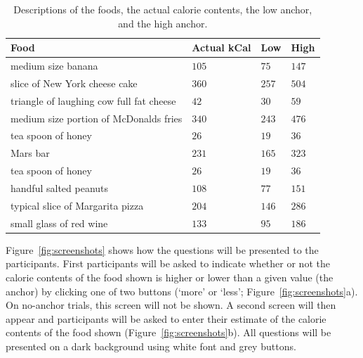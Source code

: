 \documentclass[a4paper,doc,natbib]{apa6}
\begin{document}
    \begin{table}[!h]
        \caption{Descriptions of the foods, the actual calorie contents, the low anchor, and the high anchor.}
        \label{tab:descriptions}
        \begin{tabular}{p{7cm}p{2cm}p{2cm}p{2cm}}
            \hline
            Food                                     & Actual kCal & Low   & High  \\
            \hline
            medium size banana                       & $105$       & $75$  & $147$ \\
            slice of New York cheese cake            & $360$       & $257$ & $504$ \\
            triangle of laughing cow full fat cheese & $42$        & $30$  & $59$  \\
            medium size portion of McDonalds fries   & $340$       & $243$ & $476$ \\
            tea spoon of honey                       & $26$        & $19$  & $36$  \\
            Mars bar                                 & $231$       & $165$ & $323$ \\
            tea spoon of honey                       & $26$        & $19$  & $36$  \\
            handful salted peanuts                   & $108$       & $77$  & $151$ \\
            typical slice of Margarita pizza         & $204$       & $146$ & $286$ \\
            small glass of red wine                  & $133$       & $95$  & $186$ \\
            \hline
        \end{tabular}
    \end{table}

    Figure~\ref{fig:screenshots} shows how the questions will be presented to the participants. First participants will be asked to indicate whether or not the calorie contents of the food shown is higher or lower than a given value (the anchor) by clicking one of two buttons (`more' or `less'; Figure~\ref{fig:screenshots}a). On no-anchor trials, this screen will not be shown. A second screen will then appear and participants will be asked to enter their estimate of the calorie contents of the food shown (Figure~\ref{fig:screenshots}b). All questions will be presented on a dark background using white font and grey buttons.
\end{document}
